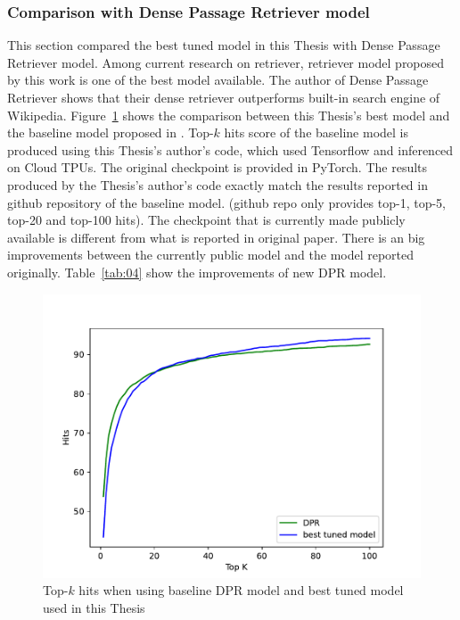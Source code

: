 \documentclass[12pt, sort&compress]{report}
\begin{document}
\subsubsection{Comparison with Dense Passage Retriever model\cite{karpukhin2020dense}}
\label{sec:4.4.1.6}
This section compared the best tuned model in this Thesis with Dense Passage Retriever \cite{karpukhin2020dense} model. Among current research on retriever, retriever model proposed by this work is one of the best model available. The author of Dense Passage Retriever shows that their dense retriever outperforms built-in search engine of Wikipedia. Figure~\ref{fig:17} shows the comparison between this Thesis's best model and the baseline model proposed in \cite{karpukhin2020dense}. Top-$k$ hits score of the baseline model is produced using this Thesis's author's code, which used Tensorflow and inferenced on Cloud TPUs. The original checkpoint is provided in PyTorch. The results produced by the Thesis's author's code exactly match the results reported in github repository of the baseline model. (github repo only provides top-1, top-5, top-20 and top-100 hits). The checkpoint that is currently made publicly available is different from what is reported in original paper. There is an big improvements between the currently public model and the model reported originally. Table~\ref{tab:04} show the improvements of new DPR model.
\begin{figure}[!htbp]
	\centering
	\includegraphics[scale=.7]{images/PDF/experiments/benchmark_compare.pdf}
	\caption{Top-$k$ hits when using baseline DPR model and best tuned model used in this Thesis}
	\label{fig:17}
\end{figure}
\end{document}
